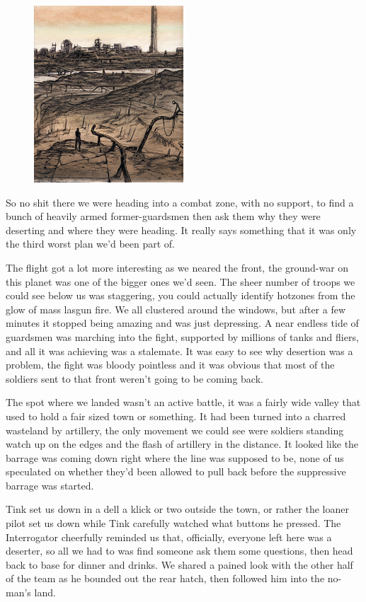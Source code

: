 \begin{figure}
	\begin{center}
		\includegraphics[width=\figwidth]{pics/9/15.png}
	\end{center}
\end{figure}
So no shit there we were heading into a combat zone, with no support, to find a bunch of heavily armed former-guardsmen then ask them why they were deserting and where they were heading. 
It really says something that it was only the third worst plan we'd been part of.

The flight got a lot more interesting as we neared the front, the ground-war on this planet was one of the bigger ones we'd seen. 
The sheer number of troops we could see below us was staggering, you could actually identify hotzones from the glow of mass lasgun fire. 
We all clustered around the windows, but after a few minutes it stopped being amazing and was just depressing. 
A near endless tide of guardsmen was marching into the fight, supported by millions of tanks and fliers, and all it was achieving was a stalemate. 
It was easy to see why desertion was a problem, the fight was bloody pointless and it was obvious that most of the soldiers sent to that front weren't going to be coming back.

The spot where we landed wasn't an active battle, it was a fairly wide valley that used to hold a fair sized town or something. 
It had been turned into a charred wasteland by artillery, the only movement we could see were soldiers standing watch up on the edges and the flash of artillery in the distance. 
It looked like the barrage was coming down right where the line was supposed to be, none of us speculated on whether they'd been allowed to pull back before the suppressive barrage was started.

Tink set us down in a dell a klick or two outside the town, or rather the loaner pilot set us down while Tink carefully watched what buttons he pressed. 
The Interrogator cheerfully reminded us that, officially, everyone left here was a deserter, so all we had to was find someone ask them some questions, then head back to base for dinner and drinks. 
We shared a pained look with the other half of the team as he bounded out the rear hatch, then followed him into the no-man's land.

